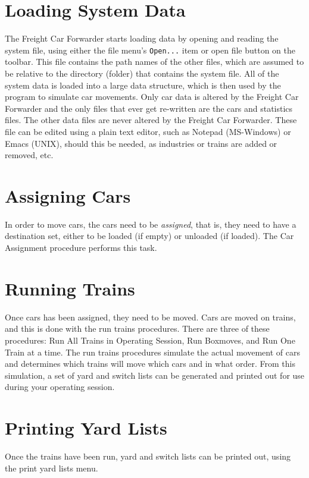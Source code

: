 \section{Loading System Data}

The Freight Car Forwarder starts loading data by opening and reading
the system file, using either the file menu's \verb=Open...= item or open file
button on the toolbar.  This file contains the path names of the other
files, which are assumed to be relative to the directory (folder) that
contains the system file.  All of the system data is loaded into a
large data structure, which is then used by the program to simulate car
movements. Only car data is altered by the Freight Car Forwarder and the only
files that ever get re-written are the cars and statistics files.  The
other data files are never altered by the Freight Car Forwarder.  These
file can be edited using a plain text editor, such as Notepad
(MS-Windows) or Emacs (UNIX), should this be needed, as industries or
trains are added or removed, etc.

\section{Assigning Cars}

  In order to move cars, the cars need to be \emph{assigned}, that is, they
need to have a destination set, either to be loaded (if empty) or
unloaded (if loaded).  The Car Assignment procedure performs this task.

\section{Running Trains}

Once cars has been assigned, they need to be moved.  Cars are moved on
trains, and this is done with the run trains procedures.  There are
three of these procedures: Run All Trains in Operating Session, Run
Boxmoves, and Run One Train at a time.  The run trains procedures
simulate the actual movement of cars and determines which trains will
move which cars and in what order.  From this simulation, a set of yard
and switch lists can be generated and printed out for use during your
operating session.

\section{Printing Yard Lists}

Once the trains have been run, yard and switch lists can be printed
out, using the print yard lists menu.

